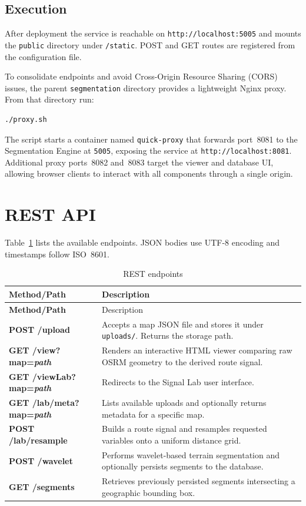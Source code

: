 \documentclass{article}
\begin{document}
\subsection{Execution}
After deployment the service is reachable on \texttt{http://localhost:5005} and mounts the \texttt{public} directory under \texttt{/static}. POST and GET routes are registered from the configuration file.

To consolidate endpoints and avoid Cross-Origin Resource Sharing (CORS) issues, the parent
\texttt{segmentation} directory provides a lightweight Nginx proxy. From that directory run:
\begin{verbatim}
./proxy.sh
\end{verbatim}
The script starts a container named \texttt{quick-proxy} that forwards port~8081 to the
Segmentation Engine at \texttt{5005}, exposing the service at \texttt{http://localhost:8081}.
Additional proxy ports~8082 and~8083 target the viewer and database UI, allowing browser
clients to interact with all components through a single origin.

\section{REST API}
Table~\ref{tab:api} lists the available endpoints. JSON bodies use UTF-8 encoding and timestamps follow ISO~8601.
\begin{longtable}{>{\bfseries}p{5cm}p{9cm}}
\caption{REST endpoints}\label{tab:api}\\
Method/Path & Description \\\hline
\endfirsthead
Method/Path & Description \\\hline
\endhead
POST /upload & Accepts a map JSON file and stores it under \texttt{uploads/}. Returns the storage path.\\
GET /view?map=\emph{path} & Renders an interactive HTML viewer comparing raw OSRM geometry to the derived route signal.\\
GET /viewLab?map=\emph{path} & Redirects to the Signal Lab user interface.\\
GET /lab/meta?map=\emph{path} & Lists available uploads and optionally returns metadata for a specific map.\\
POST /lab/resample & Builds a route signal and resamples requested variables onto a uniform distance grid.\\
POST /wavelet & Performs wavelet-based terrain segmentation and optionally persists segments to the database.\\
GET /segments & Retrieves previously persisted segments intersecting a geographic bounding box.\\
\end{longtable}
\end{document}
